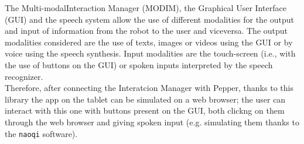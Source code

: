 \documentclass[12pt, letterpaper, twoside]{article}
\begin{document}
The Multi-modalInteraction Manager (MODIM), the Graphical User Interface (GUI) and the speech system allow the use of different modalities for the output and input of information from the robot to the user and viceversa. The output modalities considered are the use of texts, images or videos using the GUI or by voice using the speech synthesis. Input modalities are the touch-screen (i.e., with the use of buttons on the GUI) or spoken inputs interpreted by the speech recognizer.\\

Therefore, after connecting the Interatcion Manager with Pepper, thanks to this library the app on the tablet can be simulated on a web browser; the user can interact with this one with buttons present on the GUI, both clickng on them through the web browser and giving spoken input (e.g. simulating them thanks to the \verb|naoqi| software).
\end{document}
